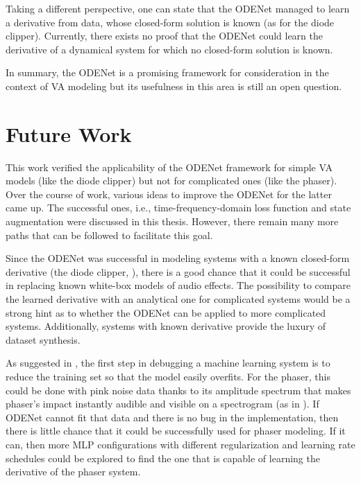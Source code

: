 Taking a different perspective, one can state that the ODENet managed to learn a derivative from data, whose closed-form solution is known (as for the diode clipper). Currently, there exists no proof that the ODENet could learn the derivative of a dynamical system for which no closed-form solution is known.

In summary, the ODENet is a promising framework for consideration in the context of \ac{VA} modeling but its usefulness in this area is still an open question.

\section{Future Work}
\label{sec:future_work}

This work verified the applicability of the ODENet framework for simple \ac{VA} models (like the diode clipper) but not for complicated ones (like the phaser). Over the course of work, various ideas to improve the ODENet for the latter came up. The successful ones, i.e., time-frequency-domain loss function and state augmentation were discussed in this thesis. However, there remain many more paths that can be followed to facilitate this goal.

Since the ODENet was successful in modeling systems with a known closed-form derivative (the diode clipper, \cite{Chen2018,Karlsson2019}), there is a good chance that it could be successful in replacing known white-box models of audio effects. The possibility to compare the learned derivative with an analytical one for complicated systems would be a strong hint as to whether the ODENet can be applied to more complicated systems. Additionally, systems with known derivative provide the luxury of dataset synthesis.

As suggested in \cite{Bengio2012}, the first step in debugging a machine learning system is to reduce the training set so that the model easily overfits. For the phaser, this could be done with pink noise data thanks to its amplitude spectrum that makes phaser's impact instantly audible and visible on a spectrogram (as in ). If ODENet cannot fit that data and there is no bug in the implementation, then there is little chance that it could be successfully used for phaser modeling. If it can, then more \ac{MLP} configurations with different regularization and learning rate schedules could be explored to find the one that is capable of learning the derivative of the phaser system.

